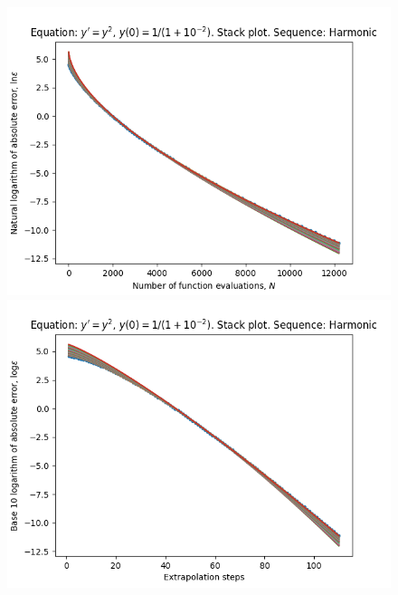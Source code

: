 \begin{figure}[H]
\centering
\begin{minipage}{0.45\textwidth}
\centering
\includegraphics[scale=0.45]{../results/emr_plots/singularity_2_hp_harmonic_stack.png}
\end{minipage}
\begin{minipage}{0.45\textwidth}
\centering
\includegraphics[scale=0.45]{../results/emr_plots/singularity_2_hp_harmonic_steps_stack.png}
\end{minipage}
\end{figure}

